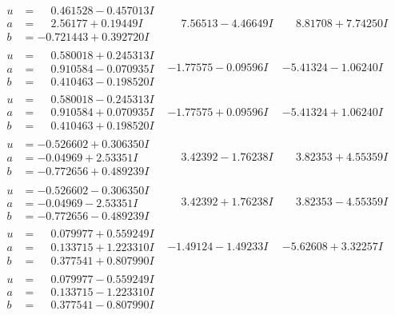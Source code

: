 \documentclass[1p]{elsarticle_modified}
\theoremstyle{definition}
\begin{document}
$$\begin{array}{c|c|c}
\begin{aligned}
u &= \phantom{-}0.461528 - 0.457013 I \\
a &= \phantom{-}2.56177 + 0.19449 I \\
b &= -0.721443 + 0.392720 I\end{aligned}
 & \phantom{-}7.56513 - 4.46649 I & \phantom{-}8.81708 + 7.74250 I \\ \hline\begin{aligned}
u &= \phantom{-}0.580018 + 0.245313 I \\
a &= \phantom{-}0.910584 - 0.070935 I \\
b &= \phantom{-}0.410463 - 0.198520 I\end{aligned}
 & -1.77575 - 0.09596 I & -5.41324 - 1.06240 I \\ \hline\begin{aligned}
u &= \phantom{-}0.580018 - 0.245313 I \\
a &= \phantom{-}0.910584 + 0.070935 I \\
b &= \phantom{-}0.410463 + 0.198520 I\end{aligned}
 & -1.77575 + 0.09596 I & -5.41324 + 1.06240 I \\ \hline\begin{aligned}
u &= -0.526602 + 0.306350 I \\
a &= -0.04969 + 2.53351 I \\
b &= -0.772656 + 0.489239 I\end{aligned}
 & \phantom{-}3.42392 - 1.76238 I & \phantom{-}3.82353 + 4.55359 I \\ \hline\begin{aligned}
u &= -0.526602 - 0.306350 I \\
a &= -0.04969 - 2.53351 I \\
b &= -0.772656 - 0.489239 I\end{aligned}
 & \phantom{-}3.42392 + 1.76238 I & \phantom{-}3.82353 - 4.55359 I \\ \hline\begin{aligned}
u &= \phantom{-}0.079977 + 0.559249 I \\
a &= \phantom{-}0.133715 + 1.223310 I \\
b &= \phantom{-}0.377541 + 0.807990 I\end{aligned}
 & -1.49124 - 1.49233 I & -5.62608 + 3.32257 I \\ \hline\begin{aligned}
u &= \phantom{-}0.079977 - 0.559249 I \\
a &= \phantom{-}0.133715 - 1.223310 I \\
b &= \phantom{-}0.377541 - 0.807990 I\end{aligned}

\end{array}$$
\end{document}
